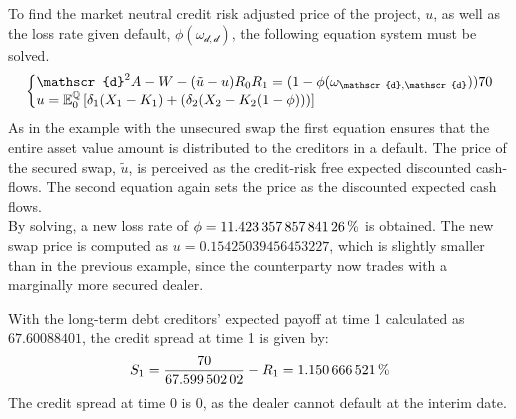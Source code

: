 \documentclass[main.tex]{subfiles}
\begin{document}
        To find the market neutral credit risk adjusted price of the project, $u$, 
        as well as the loss rate given default, $\phi(\omega_{\mathscr{d},\mathscr{d}})$,
        the following equation system must be solved.
        \begin{equation}
            \left\{\begin{array}{@{}l@{}}
                \mathscr{d}^{2} A - W - (\tilde{u}-u)R_{0}R_{1}
                =
                (1-\phi(\omega_{\mathscr{d},\mathscr{d}}))\num{70}
                \\
                u =
                \mathbb{E}_{0}^{\rnmeasure}\left[
                    \delta_{1}(X_1-K_1)+(\delta_{2}(X_2-K_2(1-\phi)))
                \right]
            \end{array}\right.
        \end{equation}
        As in the example with the unsecured swap the first equation ensures
        that the entire asset value amount is distributed to the creditors in a default.
        The price of the secured swap, $\tilde{u}$, is perceived as the credit-risk free expected discounted cash-flows.
        The second equation again sets the price as the discounted expected cash flows.
        \\
        By solving, a new loss rate of $\phi = \pct{0.11423357857841265}$ is obtained.
        The new swap price is computed as $u=\num{0.15425039456453227}$,
        which is slightly smaller than in the previous example,
        since the counterparty now trades with a marginally more secured dealer.

        With the long-term debt creditors' expected payoff at time 1 calculated as $\num{67.60088401}$,
        the credit spread at time 1 is given by:
        \begin{equation}
            S_1 =
            \frac{
                \num{70}
            }{
                \num{67.59950202}
            }
            - R_{1}
            \nonumber
            = \pct{0.01150666521}
        \end{equation}
        The credit spread at time 0 is 0,
        as the dealer cannot default at the interim date.
\end{document}
